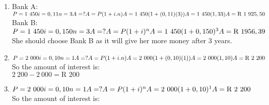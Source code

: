 \begin{eocsolutions}{}
{\begin{enumerate}[itemsep=5pt, label=\textbf{\arabic*}. ]
\begin{multicols}{2}
\begin{enumerate}[noitemsep, label=\textbf{(\alph*)} ]
 \item  $P = 500\\
i=0,04\\
n=1\\
A=?\\
A=P(1 + i)^{n}\\
A = 500(1 + 0,04)^{1}\\
A = \mbox{R }520$
	\end{enumerate}
\end{multicols}
\item Bank A:\\
$P=1~450\\
i=0,11\\
n=3\\
A=?\\
 A=P(1 + i . n) \\
A = 1~450(1+ (0,11)(3))\\
A = 1~450(1,33)\\
A = \mbox{R }1~925,50$\\
Bank B:\\
 $P = 1~450\\
i=0,150\\
n=3\\
A=?\\
A=P(1 + i)^{n}\\
A = 1~450(1 + 0,150)^{3}\\
A = \mbox{R }1956,39$\\
She should choose Bank B as it will give her more money after 3 years.
\item $P=2~000\\
i=0,10\\
n=1\\
A=?\\
 A=P(1 + i . n) \\
A = 2~000(1+ (0,10)(1))\\
A = 2~000(1,10)\\
A = \mbox{R }2~200$\\
So the amount of interest is:\\
$2~200 - 2~000 = \mbox{R }200$
\item  $P = 2~000\\
i=0,10\\
n=1\\
A=?\\
A=P(1 + i)^{n}\\
A = 2~000(1 + 0,10)^{1}\\
A = \mbox{R }2~200$\\
So the amount of interest is:\\

\end{enumerate}}
\end{eocsolutions}
